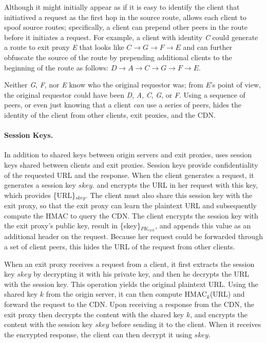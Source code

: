 Although it might initially appear as if it is easy to identify the client
that initiatived a request as the first hop in the source route, \system{}
allows each client to spoof source routes; specifically, a client can prepend
other peers in the route before it initiates a request.  For example, a client
with identity {\it C} could generate a route to exit proxy {\it E} that looks
like $C \rightarrow G \rightarrow F \rightarrow E$ and can further obfuscate
the source of the route by prepending additional clients to the beginning of
the route as follows: $D \rightarrow A \rightarrow C \rightarrow G \rightarrow
F \rightarrow E$.

\noindent Neither {\it G}, {\it F}, nor {\it E} know who the original requestor was; from {\it E}'s point of 
view, the original requestor could have been {\it D}, {\it A}, {\it C}, {\it G},
or {\it F}.  Using a sequence of 
peers, or even just knowing that a client {\it can} use a series of peers, hides
the identity of the client 
from other clients, exit proxies, and the CDN. 

\paragraph{Session Keys.}
In addition to shared keys between origin servers and exit proxies, \system{} uses session keys shared 
between clients and exit proxies.  Session keys provide confidentiality of the requested URL and the 
response.  When the client generates a request, it generates a session key $skey$.
and encrypts 
the URL in her request with this key, which provides \{URL\}$_{skey}$.  The client
must also share this session key
with the exit proxy, so that the exit proxy can learn the plaintext URL and subsequently compute the HMAC to 
query the CDN.  The client encrypts the session key with the exit proxy's public key, result in \{skey\}$_{PK_{exit}}$, 
and appends this value as an additional header on the request.  Because her request
could be forwarded through 
a set of client peers, this hides the URL of the request from other clients.

When an exit proxy receives a request from a client, it first extracts the session
key $skey$ by decrypting it with 
his private key, and then he decrypts the URL with the session key.  This operation
yields the original plaintext
URL. Using the shared key $k$ from the origin server, it can then compute
HMAC$_k$(URL) and forward the request 
to the CDN.  Upon receiving a response from the CDN, the exit proxy then decrypts
the content with the shared key $k$, and
encrypts the content with the session key $skey$ before sending it to the client.
When it receives the encrypted response, 
the client can then decrypt it using $skey$.

